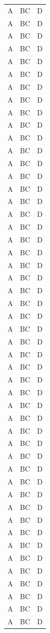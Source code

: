 \begin{longtable}{lll}
A & BC & D \\
A & BC & D \\
A & BC & D \\
A & BC & D \\
A & BC & D \\
A & BC & D \\
A & BC & D \\
A & BC & D \\
A & BC & D \\
A & BC & D \\
A & BC & D \\
A & BC & D \\
A & BC & D \\
A & BC & D \\
A & BC & D \\
A & BC & D \\
A & BC & D \\
A & BC & D \\
A & BC & D \\
A & BC & D \\
A & BC & D \\
A & BC & D \\
A & BC & D \\
A & BC & D \\
A & BC & D \\
A & BC & D \\
A & BC & D \\
A & BC & D \\
A & BC & D \\
A & BC & D \\
A & BC & D \\
A & BC & D \\
A & BC & D \\
A & BC & D \\
A & BC & D \\
A & BC & D \\
A & BC & D \\
A & BC & D \\
A & BC & D \\
A & BC & D \\
A & BC & D \\
A & BC & D \\
A & BC & D \\
A & BC & D \\
A & BC & D \\
A & BC & D \\
A & BC & D \\
A & BC & D \\
A & BC & D \\

\end{longtable}
